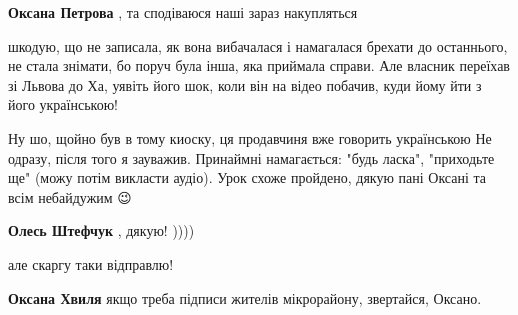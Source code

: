 \begin{itemize}
\begin{itemize}
\textbf{Оксана Петрова} , та сподіваюся наші зараз накупляться

 

шкодую, що не записала, як вона вибачалася і намагалася брехати до останнього,
не стала знімати, бо поруч була інша, яка приймала справи. Але власник переїхав
зі Львова до Ха, уявіть його шок, коли він на відео побачив, куди йому йти з
його українською!

\end{itemize}

 

Ну шо, щойно був в тому киоску, ця продавчиня вже говорить українською \Smiley[1.0][yellow] Не
одразу, після того я зауважив. Принаймні намагається: "будь ласка", "приходьте
ще" (можу потім викласти аудіо). Урок схоже пройдено, дякую пані Оксані та всім
небайдужим 😉

\begin{itemize}
 
\textbf{Олесь Штефчук} , дякую! ))))

 
але скаргу таки відправлю!

 
\textbf{Оксана Хвиля} якщо треба підписи жителів мікрорайону, звертайся, Оксано.


\end{itemize}
\end{itemize}
